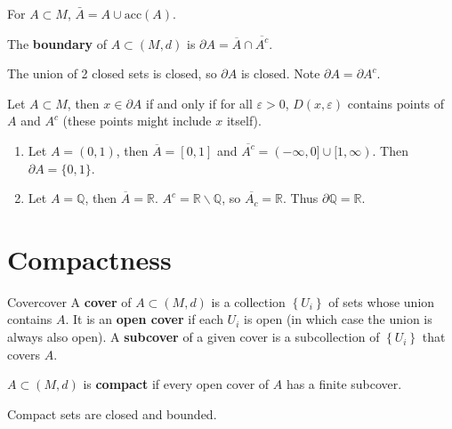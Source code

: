 \documentclass[twoside,10pt]{report}
\begin{document}
\begin{prop}
	For $A \subset M$, $\bar{A}=A \cup \text{acc}(A)$.
\end{prop}

\begin{defn}[]
	The \textbf{boundary} of $A \subset (M,d)$ is $\partial A = \overline{A}\cap \overline{A^c}$.
\end{defn}
The union of 2 closed sets is closed, so $\partial A$ is closed. Note $\partial A = \partial A^c $.

\begin{prop}
	Let $A \subset M$, then $x \in \partial A$ if and only if for all $\varepsilon>0$, $D(x,\varepsilon)$ contains points of $A$ and $A^c$ (these points might include $x$ itself).
\end{prop}

\begin{ex}[]
	\begin{enumerate}
		\item Let $A=(0,1)$, then $\overline{A}=[0,1]$ and $\overline{A^c} =(-\infty,0] \cup[1,\infty)$. Then $\partial A = \{0,1\}$.
		\item Let $A=\mathbb{Q}$, then $\overline{A}=\mathbb{R}$. $A^c = \mathbb{R}\backslash \mathbb{Q}$, so $\overline{A_c} = \mathbb{R}$. Thus $\partial \mathbb{Q}=\mathbb{R}$.
	\end{enumerate}
\end{ex}


\section{Compactness}

\begin{defn}{Cover}{cover}
	A \textbf{cover} of $A \subset (M,d)$ is a collection $\left\{ U_i \right\}$ of sets whose union contains $A$. It is an \textbf{open cover} if each $U_i$ is open (in which case the union is always also open). A \textbf{subcover} of a given cover is a subcollection of $\left\{ U_i \right\}$ that covers $A$.
\end{defn}

\begin{defn}[]
	$A \subset (M,d)$ is \textbf{compact} if every open cover of $A$ has a finite subcover.
\end{defn}

\begin{prop}
Compact sets are closed and bounded.
\end{prop}
\end{document}
